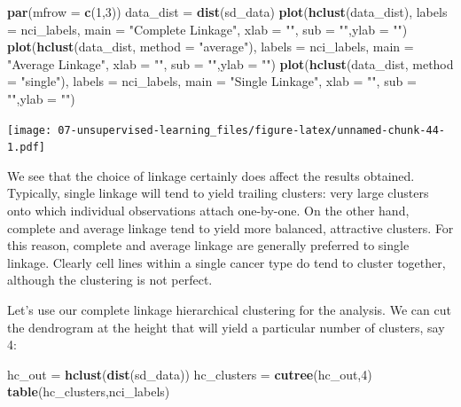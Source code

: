 \documentclass[openany]{book}
\newenvironment{Shaded}{\begin{snugshade}}{\end{snugshade}}
\newcommand{\DataTypeTok}[1]{\textcolor[rgb]{0.13,0.29,0.53}{#1}}
\newcommand{\DecValTok}[1]{\textcolor[rgb]{0.00,0.00,0.81}{#1}}
\newcommand{\KeywordTok}[1]{\textcolor[rgb]{0.13,0.29,0.53}{\textbf{#1}}}
\newcommand{\NormalTok}[1]{#1}
\newcommand{\StringTok}[1]{\textcolor[rgb]{0.31,0.60,0.02}{#1}}
\begin{document}
\begin{Shaded}
\begin{Highlighting}[]
\KeywordTok{par}\NormalTok{(}\DataTypeTok{mfrow =} \KeywordTok{c}\NormalTok{(}\DecValTok{1}\NormalTok{,}\DecValTok{3}\NormalTok{))}
\NormalTok{data_dist =}\StringTok{ }\KeywordTok{dist}\NormalTok{(sd_data)}
\KeywordTok{plot}\NormalTok{(}\KeywordTok{hclust}\NormalTok{(data_dist), }\DataTypeTok{labels =}\NormalTok{ nci_labels, }\DataTypeTok{main =} \StringTok{"Complete Linkage"}\NormalTok{, }\DataTypeTok{xlab =} \StringTok{""}\NormalTok{, }\DataTypeTok{sub =} \StringTok{""}\NormalTok{,}\DataTypeTok{ylab =} \StringTok{""}\NormalTok{)}
\KeywordTok{plot}\NormalTok{(}\KeywordTok{hclust}\NormalTok{(data_dist, }\DataTypeTok{method =} \StringTok{"average"}\NormalTok{), }\DataTypeTok{labels =}\NormalTok{ nci_labels, }\DataTypeTok{main =} \StringTok{"Average Linkage"}\NormalTok{, }\DataTypeTok{xlab =} \StringTok{""}\NormalTok{, }\DataTypeTok{sub =} \StringTok{""}\NormalTok{,}\DataTypeTok{ylab =} \StringTok{""}\NormalTok{)}
\KeywordTok{plot}\NormalTok{(}\KeywordTok{hclust}\NormalTok{(data_dist, }\DataTypeTok{method =} \StringTok{"single"}\NormalTok{), }\DataTypeTok{labels =}\NormalTok{ nci_labels,  }\DataTypeTok{main =} \StringTok{"Single Linkage"}\NormalTok{, }\DataTypeTok{xlab =} \StringTok{""}\NormalTok{, }\DataTypeTok{sub =} \StringTok{""}\NormalTok{,}\DataTypeTok{ylab =} \StringTok{""}\NormalTok{)}
\end{Highlighting}
\end{Shaded}

\texttt{[image: 07-unsupervised-learning\_files/figure-latex/unnamed-chunk-44-1.pdf]}

We see that the choice of linkage
certainly does affect the results obtained. Typically, single linkage will tend
to yield trailing clusters: very large clusters onto which individual observations
attach one-by-one. On the other hand, complete and average linkage
tend to yield more balanced, attractive clusters. For this reason, complete
and average linkage are generally preferred to single linkage. Clearly cell
lines within a single cancer type do tend to cluster together, although the
clustering is not perfect.

Let's use our complete linkage hierarchical clustering
for the analysis. We can cut the dendrogram at the height that will yield a particular
number of clusters, say 4:

\begin{Shaded}
\begin{Highlighting}[]
\NormalTok{hc_out =}\StringTok{ }\KeywordTok{hclust}\NormalTok{(}\KeywordTok{dist}\NormalTok{(sd_data))}
\NormalTok{hc_clusters =}\StringTok{ }\KeywordTok{cutree}\NormalTok{(hc_out,}\DecValTok{4}\NormalTok{)}
\KeywordTok{table}\NormalTok{(hc_clusters,nci_labels)}
\end{Highlighting}
\end{Shaded}
\end{document}
